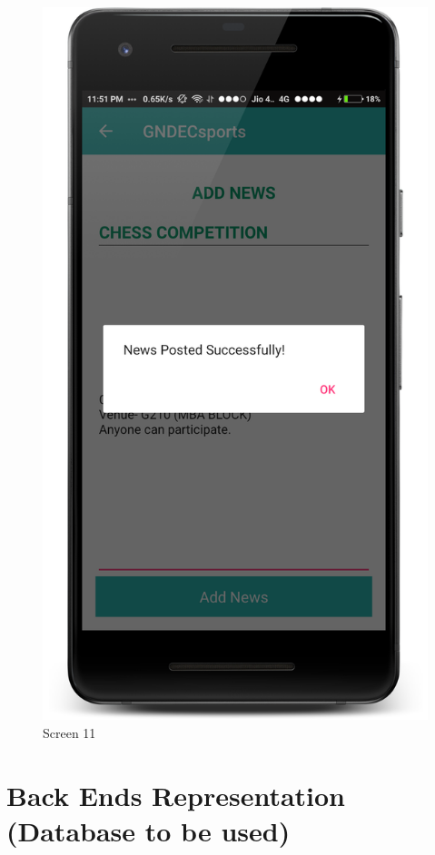 \begin{figure}[ht]
\centering
\includegraphics[scale=0.1]{images/S11.png}
\caption{Screen 11}
\end{figure}



\section{Back Ends Representation (Database to be used)}
